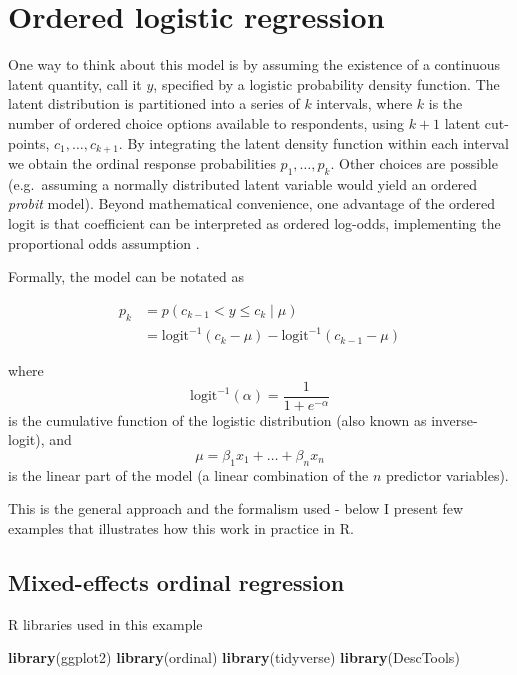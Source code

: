 \documentclass[
]{book}
\newenvironment{Shaded}{\begin{snugshade}}{\end{snugshade}}
\newcommand{\FunctionTok}[1]{\textcolor[rgb]{0.13,0.29,0.53}{\textbf{#1}}}
\newcommand{\NormalTok}[1]{#1}
\begin{document}
\section{Ordered logistic regression}\label{ordered-logistic-regression}

One way to think about this model is by assuming the existence of a continuous latent quantity, call it \(y\), specified by a logistic probability density function. The latent distribution is partitioned into a series of \(k\) intervals, where \(k\) is the number of ordered choice options available to respondents, using \(k+1\) latent cut-points, \(c_1, \ldots, c_{k+1}\). By integrating the latent density function within each interval we obtain the ordinal response probabilities \(p_1, \ldots, p_k\). Other choices are possible (e.g.~assuming a normally distributed latent variable would yield an ordered \emph{probit} model). Beyond mathematical convenience, one advantage of the ordered logit is that coefficient can be interpreted as ordered log-odds, implementing the proportional odds assumption \citep{McCullagh1980}.

Formally, the model can be notated as

\[
\begin{aligned}
p_k & = p\left(c_{k-1} < y \le c_k \mid \mu \right)\\
 & = \text{logit}^{-1}\left(c_k - \mu \right) - \text{logit}^{-1}\left(c_{k-1} - \mu \right)
\end{aligned}
\]

where
\[
\text{logit}^{-1}(\alpha) = \frac{1}{1+e^{-\alpha}}
\]
is the cumulative function of the logistic distribution (also known as inverse-logit), and
\[
\mu = \beta_1 x_1 + \ldots + \beta_n x_n
\]
is the linear part of the model (a linear combination of the \(n\) predictor variables).

This is the general approach and the formalism used - below I present few examples that illustrates how this work in practice in R.

\subsection{Mixed-effects ordinal regression}\label{mixed-effects-ordinal-regression}

R libraries used in this example

\begin{Shaded}
\begin{Highlighting}[]
\FunctionTok{library}\NormalTok{(ggplot2)}
\FunctionTok{library}\NormalTok{(ordinal)}
\FunctionTok{library}\NormalTok{(tidyverse)}
\FunctionTok{library}\NormalTok{(DescTools)}
\end{Highlighting}
\end{Shaded}
\end{document}
